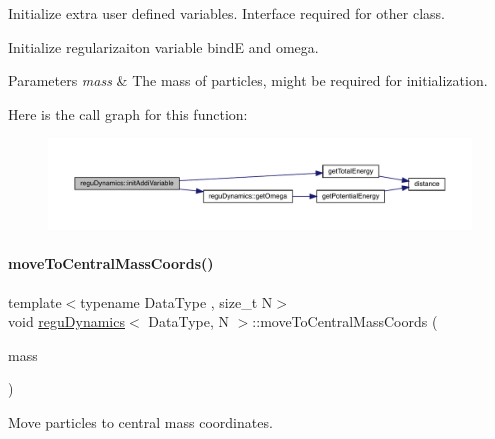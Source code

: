 Initialize extra user defined variables. Interface required for other class. 

Initialize regularizaiton variable bindE and omega. 
\begin{DoxyParams}{Parameters}
{\em mass} & The mass of particles, might be required for initialization. \\
\hline
\end{DoxyParams}
Here is the call graph for this function\+:\nopagebreak
\begin{figure}[H]
\begin{center}
\leavevmode
\includegraphics[width=350pt]{classregu_dynamics_aa42158ddf3c5385aa89988b9bb80ff29_cgraph}
\end{center}
\end{figure}
\mbox{\label{classregu_dynamics_adb57f1775922d615b8e506eaf79a1bc0}} 
\paragraph{\texorpdfstring{move\+To\+Central\+Mass\+Coords()}{moveToCentralMassCoords()}}
{\footnotesize\ttfamily template$<$typename Data\+Type , size\+\_\+t N$>$ \\
void \mbox{\hyperlink{classregu_dynamics}{regu\+Dynamics}}$<$ Data\+Type, N $>$\+::move\+To\+Central\+Mass\+Coords (\begin{DoxyParamCaption}\item[{\mbox{\hyperlink{classregu_dynamics_a34b4b77ea3e49e1cdef584ec8bd281dc}{Scalar\+Array}} \&}]{mass }\end{DoxyParamCaption})\hspace{0.3cm}{\ttfamily [inline]}}



Move particles to central mass coordinates. 


